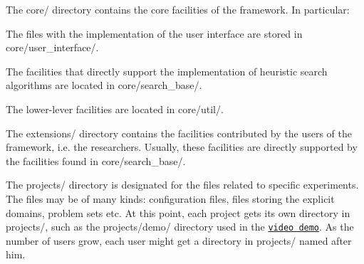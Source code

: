 \begin{DoxyItemize}
\item The {\ttfamily core/} directory contains the core facilities of the framework. In particular\+:
\begin{DoxyItemize}
\item The files with the implementation of the user interface are stored in {\ttfamily core/user\+\_\+interface/}.
\item The facilities that directly support the implementation of heuristic search algorithms are located in {\ttfamily core/search\+\_\+base/}.
\item The lower-\/lever facilities are located in {\ttfamily core/util/}.
\end{DoxyItemize}
\item The {\ttfamily extensions/} directory contains the facilities contributed by the users of the framework, i.\+e. the researchers. Usually, these facilities are directly supported by the facilities found in {\ttfamily core/search\+\_\+base/}.
\item The {\ttfamily projects/} directory is designated for the files related to specific experiments. The files may be of many kinds\+: configuration files, files storing the explicit domains, problem sets etc. At this point, each project gets its own directory in {\ttfamily projects/}, such as the {\ttfamily projects/demo/} directory used in the \href{https://youtu.be/cElxLWve1Zw}{\tt video demo}. As the number of users grow, each user might get a directory in {\ttfamily projects/} named after him.
\end{DoxyItemize}

